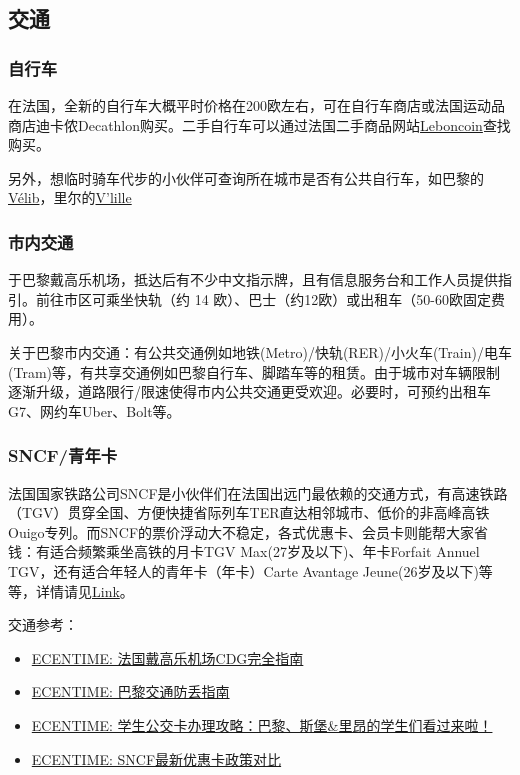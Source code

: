 \subsection{交通}

\subsubsection{自行车}
在法国，全新的自行车大概平时价格在200欧左右，可在自行车商店或法国运动品商店迪卡侬Decathlon购买。二手自行车可以通过法国二手商品网站\href{https://www.leboncoin.fr/}{Leboncoin}查找购买。

另外，想临时骑车代步的小伙伴可查询所在城市是否有公共自行车，如巴黎的\href{http://www.velib.paris/}{Vélib}，里尔的\href{https://www.lillemetropole.fr/votre-quotidien/se-deplacer/se-deplacer-velo}{V’lille} 

\subsubsection{市内交通}
于巴黎戴高乐机场，抵达后有不少中文指示牌，且有信息服务台和工作人员提供指引。前往市区可乘坐快轨（约 14 欧）、巴士（约12欧）或出租车（50-60欧固定费用）。

关于巴黎市内交通：有公共交通例如地铁(Metro)/快轨(RER)/小火车(Train)/电车(Tram)等，有共享交通例如巴黎自行车、脚踏车等的租赁。由于城市对车辆限制逐渐升级，道路限行/限速使得市内公共交通更受欢迎。必要时，可预约出租车G7、网约车Uber、Bolt等。

\subsubsection{SNCF/青年卡}

法国国家铁路公司SNCF是小伙伴们在法国出远门最依赖的交通方式，有高速铁路（TGV）贯穿全国、方便快捷省际列车TER直达相邻城市、低价的非高峰高铁Ouigo专列。而SNCF的票价浮动大不稳定，各式优惠卡、会员卡则能帮大家省钱：有适合频繁乘坐高铁的月卡TGV Max(27岁及以下)、年卡Forfait Annuel TGV，还有适合年轻人的青年卡（年卡）Carte Avantage Jeune(26岁及以下)等等，详情请见\href{https://www.ecentime.com/article/avantage-carte-sncf}{Link}。

交通参考：
\begin{itemize}
    \item \href{https://www.ecentime.com/article/aeroport-CDG%202020}{ECENTIME: 法国戴高乐机场CDG完全指南}
    \item \href{https://www.ecentime.com/article/transport-paris}{ECENTIME: 巴黎交通防丢指南}
    \item \href{https://www.ecentime.com/article/reduction-transport-etudiant}{ECENTIME: 学生公交卡办理攻略：巴黎、斯堡\&里昂的学生们看过来啦！}
    \item \href{https://www.ecentime.com/article/ecentime-sncf-reduction}{ECENTIME: SNCF最新优惠卡政策对比}
\end{itemize}

